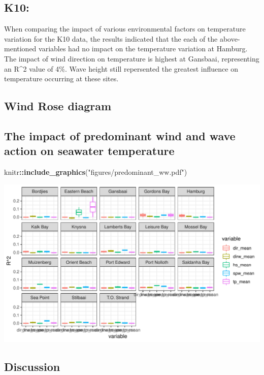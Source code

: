 \documentclass[12pt,]{article}
\newenvironment{Shaded}{\begin{snugshade}}{\end{snugshade}}
\newcommand{\KeywordTok}[1]{\textcolor[rgb]{0.13,0.29,0.53}{\textbf{#1}}}
\newcommand{\StringTok}[1]{\textcolor[rgb]{0.31,0.60,0.02}{#1}}
\newcommand{\OperatorTok}[1]{\textcolor[rgb]{0.81,0.36,0.00}{\textbf{#1}}}
\newcommand{\NormalTok}[1]{#1}
\begin{document}
\subsection{K10:}\label{k10}

When comparing the impact of various environmental factors on
temperature variation for the K10 data, the results indicated that the
each of the above-mentioned variables had no impact on the temperature
variation at Hamburg. The impact of wind direction on temperature is
highest at Gansbaai, representing an R\^{}2 value of 4\%. Wave height
still repersented the greatest influence on temperature occurring at
these sites.

\subsection{Wind Rose diagram}\label{wind-rose-diagram}

\subsection{The impact of predominant wind and wave action on seawater
temperature}\label{the-impact-of-predominant-wind-and-wave-action-on-seawater-temperature}

\begin{Shaded}
\begin{Highlighting}[]
\NormalTok{knitr}\OperatorTok{::}\KeywordTok{include_graphics}\NormalTok{(}\StringTok{"figures/predominant_ww.pdf"}\NormalTok{)}
\end{Highlighting}
\end{Shaded}

\includegraphics{figures/predominant_ww.pdf}

\subsection{Discussion}\label{discussion}
\end{document}
